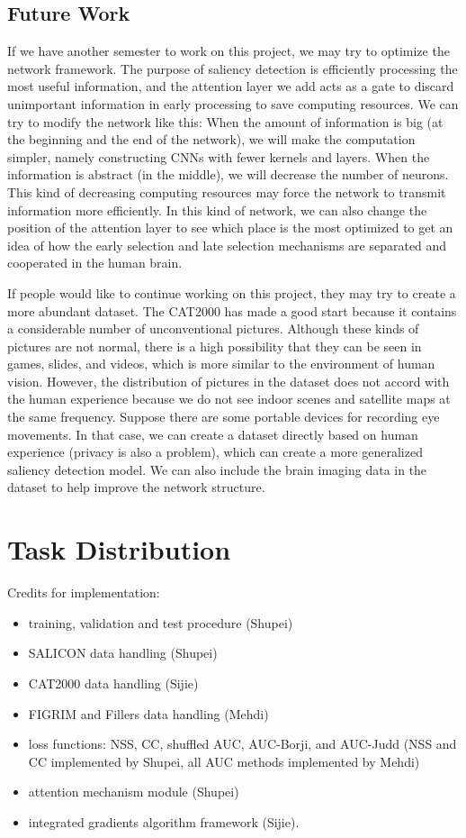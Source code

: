 \documentclass[12pt]{article}
\begin{document}
\subsection{Future Work}

If we have another semester to work on this project, we may try to optimize the network framework.
The purpose of saliency detection is efficiently processing the most useful information, and the attention layer we add acts as a gate to discard unimportant information in early processing to save computing resources.
We can try to modify the network like this: When the amount of information is big (at the beginning and the end of the network), we will make the computation simpler, namely constructing CNNs with fewer kernels and layers.
When the information is abstract (in the middle), we will decrease the number of neurons.
This kind of decreasing computing resources may force the network to transmit information more efficiently.
In this kind of network, we can also change the position of the attention layer to see which place is the most optimized to get an idea of how the early selection and late selection mechanisms are separated and cooperated in the human brain.

If people would like to continue working on this project, they may try to create a more abundant dataset. The CAT2000 has made a good start because it contains a considerable number of unconventional pictures.
Although these kinds of pictures are not normal, there is a high possibility that they can be seen in games, slides, and videos, which is more similar to the environment of human vision.
However, the distribution of pictures in the dataset does not accord with the human experience because we do not see indoor scenes and satellite maps at the same frequency.
Suppose there are some portable devices for recording eye movements. In that case, we can create a dataset directly based on human experience (privacy is also a problem), which can create a more generalized saliency detection model.
We can also include the brain imaging data in the dataset to help improve the network structure.



\section{Task Distribution}
Credits for implementation:
\begin{itemize}
    \item training, validation and test procedure (Shupei)
    \item SALICON data handling (Shupei)
    \item CAT2000 data handling (Sijie)
    \item FIGRIM and Fillers data handling (Mehdi)
    \item loss functions: NSS, CC, shuffled AUC, AUC-Borji, and AUC-Judd (NSS and CC implemented by Shupei, all AUC methods implemented by Mehdi)
    \item attention mechanism module (Shupei)
    \item integrated gradients algorithm framework (Sijie).
\end{itemize}
\end{document}
